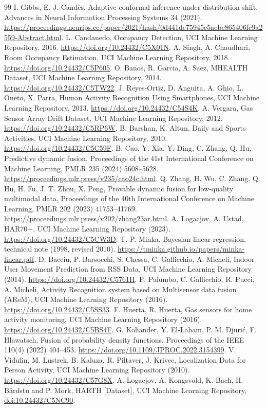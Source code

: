 \documentclass[10pt]{article}
\begin{document}
\ifdefined\FusionMainDocument
\else
\begin{thebibliography}{99}
I. Gibbs, E. J. Cand{\`e}s, Adaptive conformal inference under distribution
shift, Advances in Neural Information Processing Systems 34 (2021).
\url{https://proceedings.neurips.cc/paper/2021/hash/0d441de75945e5acbc865406fc9a2559-Abstract.html}.
L. Candanedo, Occupancy Detection, UCI Machine Learning Repository,
2016. \url{https://doi.org/10.24432/C5X01N}.
A. Singh, A. Chaudhari, Room Occupancy Estimation, UCI Machine Learning
Repository, 2018. \url{https://doi.org/10.24432/C5P605}.
O. Banos, R. Garcia, A. Saez, MHEALTH Dataset, UCI Machine Learning
Repository, 2014. \url{https://doi.org/10.24432/C5TW22}.
J. Reyes-Ortiz, D. Anguita, A. Ghio, L. Oneto, X. Parra, Human Activity
Recognition Using Smartphones, UCI Machine Learning Repository, 2013.
\url{https://doi.org/10.24432/C54S4K}.
A. Vergara, Gas Sensor Array Drift Dataset, UCI Machine Learning
Repository, 2012. \url{https://doi.org/10.24432/C5RP6W}.
B. Barshan, K. Altun, Daily and Sports Activities, UCI Machine Learning
Repository, 2010. \url{https://doi.org/10.24432/C5C59F}.
B. Cao, Y. Xia, Y. Ding, C. Zhang, Q. Hu, Predictive dynamic fusion,
Proceedings of the 41st International Conference on Machine Learning,
PMLR 235 (2024) 5608--5628.
\url{https://proceedings.mlr.press/v235/cao24c.html}.
Q. Zhang, H. Wu, C. Zhang, Q. Hu, H. Fu, J. T. Zhou, X. Peng,
Provable dynamic fusion for low-quality multimodal data,
Proceedings of the 40th International Conference on Machine Learning,
PMLR 202 (2023) 41753--41769.
\url{https://proceedings.mlr.press/v202/zhang23ar.html}.
A. Logacjov, A. Ustad, HAR70+, UCI Machine Learning Repository (2023).
\url{https://doi.org/10.24432/C5CW3D}.
T. P. Minka, Bayesian linear regression, technical note
(1998, revised 2010). \url{https://tminka.github.io/papers/minka-linear.pdf}.
D. Bacciu, P. Barsocchi, S. Chessa, C. Gallicchio, A. Micheli,
Indoor User Movement Prediction from RSS Data, UCI Machine Learning
Repository (2014). \url{https://doi.org/10.24432/C5761H}.
F. Palumbo, C. Gallicchio, R. Pucci, A. Micheli,
Activity Recognition system based on Multisensor data fusion (AReM),
UCI Machine Learning Repository (2016).
\url{https://doi.org/10.24432/C5SS33}.
F. Huerta, R. Huerta, Gas sensors for home activity monitoring,
UCI Machine Learning Repository (2016).
\url{https://doi.org/10.24432/C5BS4F}.
G. Koliander, Y. El-Laham, P. M. Djuri{\'c}, F. Hlawatsch,
Fusion of probability density functions, Proceedings of the IEEE
110(4) (2022) 404--453. \url{https://doi.org/10.1109/JPROC.2022.3154399}.
V. Vidulin, M. Lustrek, B. Kaluza, R. Piltaver, J. Krivec,
Localization Data for Person Activity, UCI Machine Learning Repository
(2010). \url{https://doi.org/10.24432/C57G8X}.
A. Logacjov, A. Kongsvold, K. Bach, H. B{\aa}rdstu and P. Mork,
HARTH [Dataset], UCI Machine Learning Repository,
\href{https://doi.org/10.24432/C5NC90}{doi:10.24432/C5NC90}.


\end{thebibliography}
\end{document}
